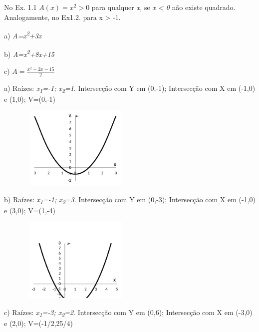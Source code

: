 \begin{enumerate}[label=\thechapter.\arabic*]
\ansitem{} No Ex. 1.1 $A(x)=x^{2} > 0$ para qualquer \textit{x,} se \textit{x < 0} não existe quadrado. Analogamente, no Ex1.2.  para  x > -1. 

\ansitem{} a) \textit{A=x\textsuperscript{2}+3x}

b) \textit{A=x\textsuperscript{2}+8x+15}

c)  \( A=\frac{x^{2}-2x-15}{2} \) 

\ansitem{}
\begin{multicols}{2}
a) Raízes: \textit{x\textsubscript{1}=-1; x\textsubscript{2}=1}. Intersecção com Y em (0,-1); Intersecção com X em (-1,0) e (1,0); V=(0,-1)

\begin{figure}[H]
	\begin{Center}
		\includegraphics[width=2.15in,height=1.55in]{capitulos/funcao_do_segundo_grau/media/image28.pdf}
	\end{Center}
\end{figure}
\end{multicols}

\begin{multicols}{2}
b) Raízes: \textit{x\textsubscript{1}=-1; x\textsubscript{2}=3}. Intersecção com Y em (0,-3); Intersecção com X em (-1,0) e (3,0); V=(1,-4)

\begin{figure}[H]
	\begin{Center}
		\includegraphics[width=2.15in,height=1.58in]{capitulos/funcao_do_segundo_grau/media/image29.pdf}
	\end{Center}
\end{figure}
\end{multicols}

\begin{multicols}{2}
c) Raízes: \textit{x\textsubscript{1}=-3; x\textsubscript{2}=2}. Intersecção com Y em (0,6); Intersecção com X em (-3,0) e (2,0); V=(-1/2,25/4)


\end{multicols}
\end{enumerate}
